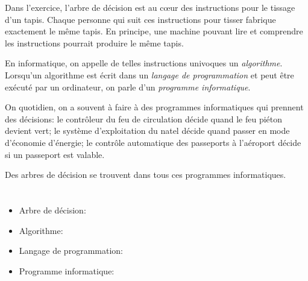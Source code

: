 {{{\centering%
\par}




Dans l’exercice, l’arbre de décision est au cœur des instructions pour le tissage d’un tapis. Chaque personne qui suit ces instructions pour tisser fabrique exactement le même tapis. En principe, une machine pouvant lire et comprendre les instructions pourrait produire le même tapis.

En informatique, on appelle de telles instructions univoques un \emph{algorithme}. Lorsqu’un algorithme est écrit dans un \emph{langage de programmation} et peut être exécuté par un ordinateur, on parle d’un \emph{programme informatique}.

On quotidien, on a souvent à faire à des programmes informatiques qui prennent des décisions: le contrôleur du feu de circulation décide quand le feu piéton devient vert; le système d’exploitation du natel décide quand passer en mode d’économie d’énergie; le contrôle automatique des passeports à l’aéroport décide si un passeport est valable.

Des arbres de décision se trouvent dans tous ces programmes informatiques.



\section*{\BrochureWebsitesAndKeywords}
{\raggedright
\begin{itemize}
  \item Arbre de décision: \href{https://fr.wikipedia.org/wiki/Arbre_de_d\%C3\%A9cision}{}
  \item Algorithme: \href{https://fr.wikipedia.org/wiki/Algorithme}{}
  \item Langage de programmation: \href{https://fr.wikipedia.org/wiki/Langage_de_programmation}{}
  \item Programme informatique: \href{https://fr.wikipedia.org/wiki/Programme_informatique}{}
\end{itemize}


}}}
